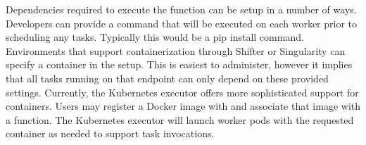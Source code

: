 Dependencies required to execute the function can be setup in a number of ways. Developers can provide a command that will be executed on each worker prior to scheduling any tasks. Typically this would be a pip install command. Environments that support containerization through Shifter or Singularity can specify a container in the setup. This is easiest to administer, however it implies that all tasks running on that endpoint can only depend on these provided settings. Currently, the Kubernetes executor offers more sophisticated support for containers. Users may register a Docker image with \funcX{} and associate that image with a function. The Kubernetes executor will launch worker pods with the requested container as needed to support task invocations.
